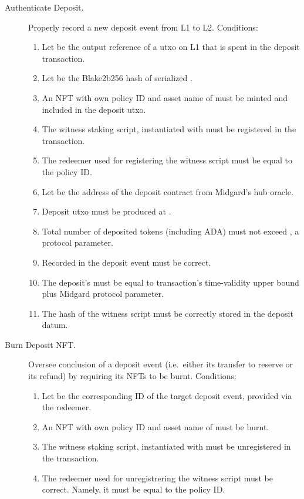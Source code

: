 \documentclass[../midgard.tex]{subfiles}
\begin{document}
\begin{description}
  \item[Authenticate Deposit.] Properly record a new deposit event from L1 to L2.
    Conditions:
      \begin{enumerate}
        \item Let  be the output reference of a utxo on L1 that is spent in the deposit transaction.
        \item Let  be the Blake2b256 hash of serialized .
        \item An NFT with own policy ID and asset name of  must be minted and included in the deposit utxo.
        \item The witness staking script, instantiated with  must be registered in the transaction.
        \item The redeemer used for registering the witness script must be equal to the  policy ID.
        \item Let  be the address of the deposit contract from Midgard's hub oracle.
        \item Deposit utxo must be produced at .
        \item Total number of deposited tokens (including ADA) must not exceed , a protocol parameter.
        \item Recorded  in the deposit event must be correct.
        \item The deposit's  must be equal to transaction's time-validity upper bound plus  Midgard protocol parameter.
        \item The hash of the witness script must be correctly stored in the deposit datum.
      \end{enumerate}
    \item[Burn Deposit NFT.] Oversee conclusion of a deposit event (i.e.\ either its transfer to reserve or its refund) by requiring its NFTs to be burnt.
    Conditions:
      \begin{enumerate}
        \item Let  be the corresponding ID of the target deposit event, provided via the redeemer.
        \item An NFT with own policy ID and asset name of  must be burnt.
        \item The witness staking script, instantiated with  must be unregistered in the transaction.
        \item The redeemer used for unregistrering the witness script must be correct. Namely, it must be equal to the  policy ID.
      \end{enumerate}
\end{description}
\end{document}
